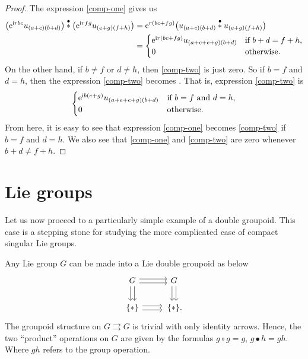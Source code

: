 \documentclass[10pt,a4paper]{amsart}
\numberwithin{equation}{section}
\theoremstyle{definition}
\newcommand{\stardot}{\overset{{\bullet}}{*}}
\newcommand{\starcirc}{\overset{\circ}{*}}
\newcommand{\darrow}{\arrow[d, shift right] \arrow[d, shift left]}
\newcommand{\rarrow}{\arrow[r, shift right] \arrow[r, shift left]}
\newcommand{\grpd}{\rightrightarrows}
\begin{document}
\begin{proof}
  The expression \eqref{comp-one} gives us
  \begin{align*}
     \big({\rm e}^{{\rm i} rbc}u_{(a+c)(b+d)}\big)\stardot\big({\rm e}^{{\rm i} rfg}u_{(e+g)(f+h)}\big)&
    = {\rm e}^{ r(bc+fg)}\big(u_{(a+c)(b+d)}\stardot u_{(e+g)(f+h)}\big)\\
    & = \begin{cases} {\rm e}^{{\rm i} r(bc+fg)} u_{(a+c+e+g)(b+d)} & \text{if } b+d=f+h,\\
    0 &\text{otherwise}.
    \end{cases}
  \end{align*}
  On the other hand, if $b\neq f$ or $d\neq h$, then \eqref{comp-two} is just zero. So if $b=f$ and $d=h$, then the expression \eqref{comp-two} becomes
\smash{$
     u_{(a+e)b} \starcirc u_{(c+g)d}
    = {\rm e}^{{\rm i} b(c+g)} u_{(a+e+c+g)(b+d)}$}.
  That is, expression \eqref{comp-two} is
  \[
  \begin{cases} {\rm e}^{{\rm i} b(c+g)} u_{(a+e+c+g)(b+d)} & \text{if } b=f\text{ and }d=h,\\
  0 & \text{otherwise}.
  \end{cases}
  \]
   From here, it is easy to see that expression \eqref{comp-one} becomes \eqref{comp-two} if $b=f$ and $d=h$. We also see that \eqref{comp-one} and \eqref{comp-two} are zero whenever $b+d\neq f+h$.
\end{proof}

\section{Lie groups}\label{Section:compact.Lie.groups}
Let us now proceed to a particularly simple example of a double groupoid. This case is a stepping stone for studying the more complicated case of compact singular Lie groups.

Any Lie group $ G $ can be made into a Lie double groupoid as below
\[
\begin{tikzcd}
 G \darrow \rarrow & G \darrow \\
\{* \} \rarrow &\, \{ * \}.
\end{tikzcd}
\]
The groupoid structure on $ G \grpd G $ is trivial with only identity arrows. Hence, the two ``product'' operations on $ G $ are given by the formulas
$g \circ g = g$, $g \bullet h = gh$.
Where $ gh$ refers to the group operation.
\end{document}

